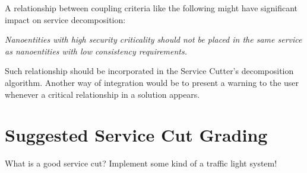 A relationship between coupling criteria like the following might have significant impact on service decomposition:

\textit{Nanoentities with high security criticality should not be placed in the same service as nanoentities with low consistency requirements.}

Such relationship should be incorporated in the Service Cutter's decomposition algorithm. Another way of integration would be to present a warning to the user whenever a critical relationship in a solution appears.

\section{Suggested Service Cut Grading}
\label{sec:suggested-cut-grades}

What is a good service cut? Implement some kind of a traffic light system!





